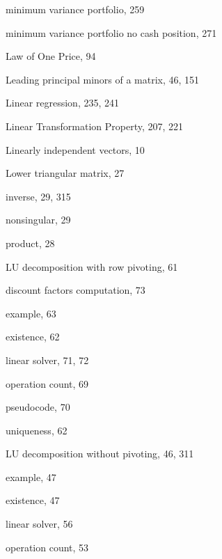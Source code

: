 {\noindent\hspace*{1.4em}minimum variance portfolio, 259

\noindent\hspace*{1.4em}minimum variance portfolio no cash position, 271

\noindent Law of One Price, 94

\noindent Leading principal minors of a matrix, 46, 151

\noindent Linear regression, 235, 241

\noindent Linear Transformation Property, 207, 221

\noindent Linearly independent vectors, 10

\noindent Lower triangular matrix, 27

\noindent\hspace*{1.4em}inverse, 29, 315

\noindent\hspace*{1.4em}nonsingular, 29

\noindent\hspace*{1.4em}product, 28

\noindent LU decomposition with row pivoting, 61

\noindent\hspace*{1.4em}discount factors computation, 73

\noindent\hspace*{1.4em}example, 63

\noindent\hspace*{1.4em}existence, 62

\noindent\hspace*{1.4em}linear solver, 71, 72

\noindent\hspace*{1.4em}operation count, 69

\noindent\hspace*{1.4em}pseudocode, 70

\noindent\hspace*{1.4em}uniqueness, 62

\noindent LU decomposition without pivoting, 46, 311

\noindent\hspace*{1.4em}example, 47

\noindent\hspace*{1.4em}existence, 47

\noindent\hspace*{1.4em}linear solver, 56

\noindent\hspace*{1.4em}operation count, 53

}

